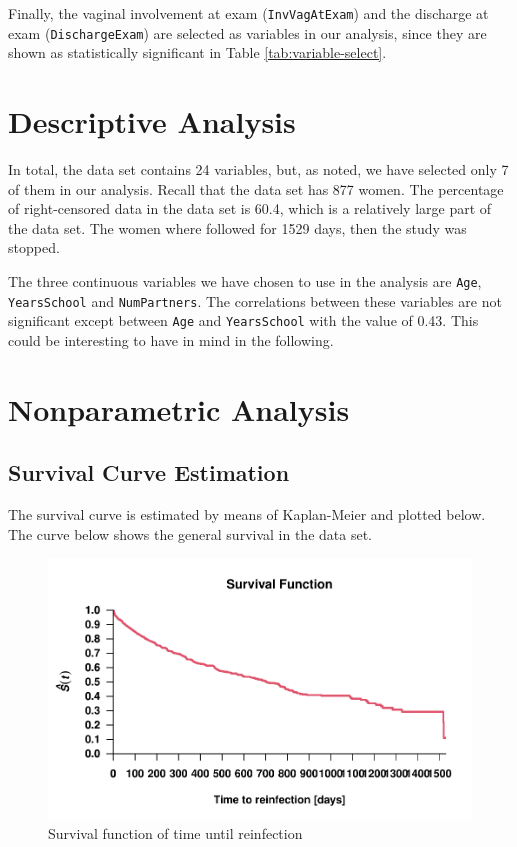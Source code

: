 \documentclass[
]{article}
\begin{document}
Finally, the vaginal involvement at exam (\texttt{InvVagAtExam}) and the discharge at exam (\texttt{DischargeExam}) are selected as variables in our analysis, since they are shown as statistically significant in Table \ref{tab:variable-select}.

\hypertarget{descriptive-analysis}{%
\section{Descriptive Analysis}\label{descriptive-analysis}}

In total, the data set contains 24 variables, but, as noted, we have selected only 7 of them in our analysis. Recall that the data set has 877 women. The percentage of right-censored data in the data set is 60.4, which is a relatively large part of the data set. The women where followed for 1529 days, then the study was stopped.

The three continuous variables we have chosen to use in the analysis are \texttt{Age}, \texttt{YearsSchool} and \texttt{NumPartners}. The correlations between these variables are not significant except between \texttt{Age} and \texttt{YearsSchool} with the value of 0.43. This could be interesting to have in mind in the following.

\hypertarget{nonparametric-analysis}{%
\section{Nonparametric Analysis}\label{nonparametric-analysis}}

\hypertarget{survival-curve-estimation}{%
\subsection{Survival Curve Estimation}\label{survival-curve-estimation}}

The survival curve is estimated by means of Kaplan-Meier and plotted below. The curve below shows the general survival in the data set.

\begin{figure}
\centering
\includegraphics{practical_files/figure-latex/survivalf-1.pdf}
\caption{\label{fig:survivalf}Survival function of time until reinfection}
\end{figure}
\end{document}
